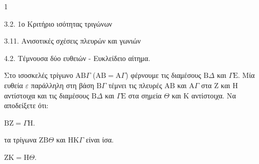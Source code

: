 \begin{ylh}{1}
    \item 3.2. 1ο Κριτήριο ισότητας τριγώνων
    \item 3.11. Ανισοτικές σχέσεις πλευρών και γωνιών
    \item 4.2. Τέμνουσα δύο ευθειών - Ευκλείδειο αίτημα.
\end{ylh}
Στο ισοσκελές τρίγωνο $\mathrm{A}\mathrm{B}\Gamma$ ($\mathrm{A}\mathrm{B} = \mathrm{A}\Gamma$) φέρνουμε τις διαμέσους $\mathrm{B}\Delta$ και $\Gamma\mathrm{E}$. Μία ευθεία $\varepsilon$ παράλληλη στη βάση $\mathrm{B}\Gamma$ τέμνει τις πλευρές $\mathrm{A}\mathrm{B}$ και $\mathrm{A}\Gamma$ στα $\mathrm{Z}$ και $\mathrm{H}$ αντίστοιχα και τις διαμέσους $\mathrm{B}\Delta$ και $\Gamma\mathrm{E}$ στα σημεία $\Theta$ και $\mathrm{K}$ αντίστοιχα.
Να αποδείξετε ότι:
\begin{alist}
    \item $\mathrm{B}\mathrm{Z} = \Gamma\mathrm{H}$. 
    \item τα τρίγωνα $\mathrm{Z}\mathrm{B}\Theta$ και $\mathrm{H}\mathrm{K}\Gamma$ είναι ίσα. 
    \item $\mathrm{Z}\mathrm{K} = \mathrm{H}\Theta$. 
\end{alist}
